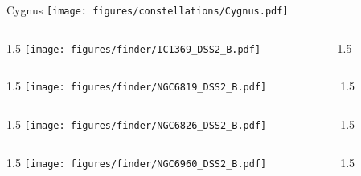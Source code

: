 \documentclass[final]{beamer}
\newlength{\colwidth}
\begin{document}

\begin{frame}[t]{\LARGE Cygnus}
  \centering
  \texttt{[image: figures/constellations/Cygnus.pdf]}
\end{frame}


\begin{frame}[t]{}
  \begin{columns}[T]
    \begin{column}{1.5\colwidth}
      \centering
      \texttt{[image: figures/finder/IC1369\_DSS2\_B.pdf]}
    \end{column}
    \begin{column}{1.5\colwidth}
      \Large
      
    \end{column}
  \end{columns}
  \vspace{\fill}
  \begin{columns}[T]
    \begin{column}{1.5\colwidth}
      \centering
      \texttt{[image: figures/finder/NGC6819\_DSS2\_B.pdf]}
    \end{column}
    \begin{column}{1.5\colwidth}
      \Large
      
    \end{column}
  \end{columns}
\end{frame}


\begin{frame}[t]{}
  \begin{columns}[T]
    \begin{column}{1.5\colwidth}
      \centering
      \texttt{[image: figures/finder/NGC6826\_DSS2\_B.pdf]}
    \end{column}
    \begin{column}{1.5\colwidth}
      \Large
      
    \end{column}
  \end{columns}
  \vspace{\fill}
  \begin{columns}[T]
    \begin{column}{1.5\colwidth}
      \centering
      \texttt{[image: figures/finder/NGC6960\_DSS2\_B.pdf]}
    \end{column}
    \begin{column}{1.5\colwidth}
      \Large
      
    \end{column}
  \end{columns}
\end{frame}
\end{document}
